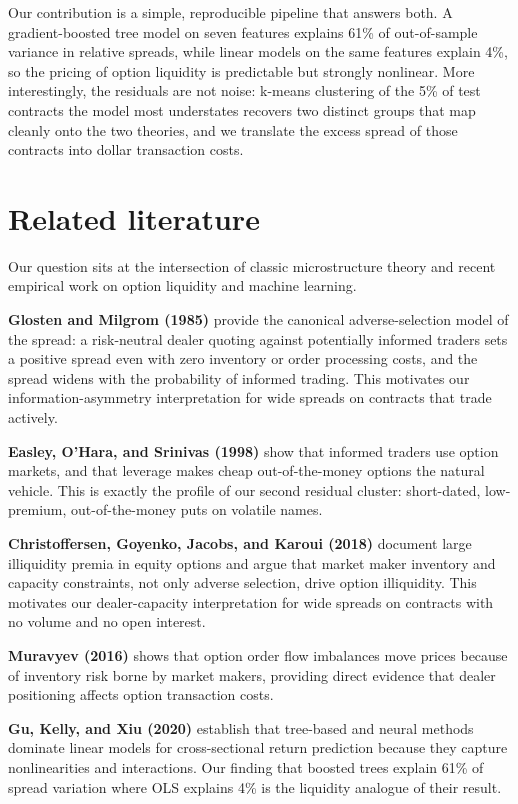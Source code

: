 \documentclass[11pt]{article}
\begin{document}
Our contribution is a simple, reproducible pipeline that answers both. A
gradient-boosted tree model on seven features explains 61\% of out-of-sample
variance in relative spreads, while linear models on the same features explain
4\%, so the pricing of option liquidity is predictable but strongly nonlinear.
More interestingly, the residuals are not noise: k-means clustering of the 5\%
of test contracts the model most understates recovers two distinct groups that
map cleanly onto the two theories, and we translate the excess spread of those
contracts into dollar transaction costs.

\section{Related literature}

Our question sits at the intersection of classic microstructure theory and
recent empirical work on option liquidity and machine learning.

\textbf{Glosten and Milgrom (1985)} provide the canonical adverse-selection
model of the spread: a risk-neutral dealer quoting against potentially
informed traders sets a positive spread even with zero inventory or order
processing costs, and the spread widens with the probability of informed
trading. This motivates our information-asymmetry interpretation for wide
spreads on contracts that trade actively.

\textbf{Easley, O'Hara, and Srinivas (1998)} show that informed traders use
option markets, and that leverage makes cheap out-of-the-money options the
natural vehicle. This is exactly the profile of our second residual cluster:
short-dated, low-premium, out-of-the-money puts on volatile names.

\textbf{Christoffersen, Goyenko, Jacobs, and Karoui (2018)} document large
illiquidity premia in equity options and argue that market maker inventory and
capacity constraints, not only adverse selection, drive option illiquidity.
This motivates our dealer-capacity interpretation for wide spreads on
contracts with no volume and no open interest.

\textbf{Muravyev (2016)} shows that option order flow imbalances move prices
because of inventory risk borne by market makers, providing direct evidence
that dealer positioning affects option transaction costs.

\textbf{Gu, Kelly, and Xiu (2020)} establish that tree-based and neural
methods dominate linear models for cross-sectional return prediction because
they capture nonlinearities and interactions. Our finding that boosted trees
explain 61\% of spread variation where OLS explains 4\% is the liquidity
analogue of their result.
\end{document}
